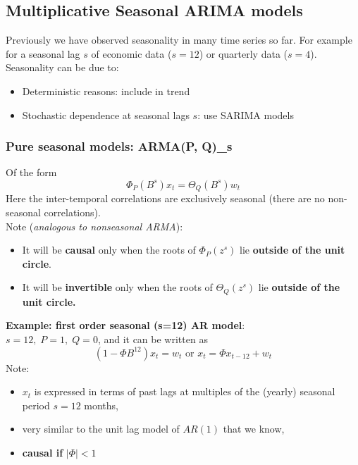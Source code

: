 \documentclass[11pt]{article}
\newcommand{\noi}{\noindent}
\begin{document}
\subsection{Multiplicative Seasonal ARIMA models}
\noi Previously we have observed seasonality in many time series so far. For example for a seasonal lag $s$ of economic data ($s=12$) or quarterly data ($s=4$). \\

\noi Seasonality can be due to:
\begin{itemize}
    \item Deterministic reasons: include in trend
    \item Stochastic dependence at seasonal lags $s$: use SARIMA models
\end{itemize}

\subsubsection{Pure seasonal models: ARMA(P, Q)_s}
\noi Of the form
$$\Phi_P(B^s)x_t = \Theta_Q(B^s)w_t$$
\noi Here the inter-temporal correlations are exclusively seasonal (there are no non-seasonal correlations). \\

\noi Note (\textit{analogous to nonseasonal ARMA}):
\begin{itemize}
    \item It will be \textbf{causal} only when the roots of $\Phi_P(z^s)$ lie \textbf{outside of the unit circle}.
    \item It will be \textbf{invertible} only when the roots of $\Theta_Q(z^s)$ lie \textbf{outside of the unit circle.}
\end{itemize} \phantom{i}

\noi \textbf{Example: first order seasonal (s=12) AR model}: \\
\noi $s=12, \; P=1, \; Q=0$, and it can be written as
$$(1-\Phi B^{12})x_t = w_t \text{ or } x_t = \Phi x_{t-12} + w_t$$
\noi Note:
\begin{itemize}
    \item $x_t$ is expressed in terms of past lags at multiples of the (yearly) seasonal period $s=12$ months,
    \item very similar to the unit lag model of $AR(1)$ that we know,
    \item \textbf{causal if} $|\Phi| < 1$
\end{itemize} \phantom{i}
\end{document}

